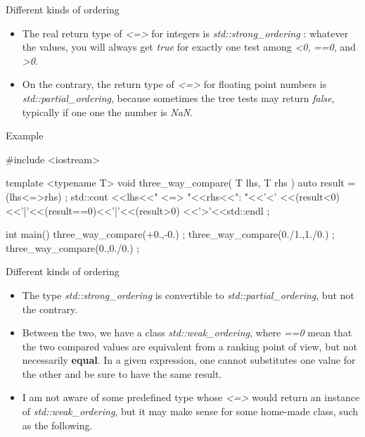 \begin{frame}[fragile]
  \begin{block}{Different kinds of ordering}
    \begin{itemize}
    \item The real return type of {\it <=>} for integers is {\it std::strong_ordering} : whatever the values, you will always get {\it true} for exactly one test among {\it <0}, {\it ==0}, and {\it >0}.
    \item On the contrary, the return type of {\it <=>} for floating point numbers is {\it std::partial_ordering}, because sometimes the tree tests may return {\it false}, typically if one one the number is {\it NaN}.
    \end{itemize}
  \end{block}
  \begin{exampleblock}{Example}
    \begin{cppcode*}{}
#include <iostream>

template <typename T>
void three_way_compare( T lhs, T rhs )
 {
  auto result = (lhs<=>rhs) ;
  std::cout
    <<lhs<<" <=> "<<rhs<<": "<<'<'
    <<(result<0)<<'|'<<(result==0)<<'|'<<(result>0)
    <<'>'<<std::endl ;
 }

int main()
 {
  three_way_compare(+0.,-0.) ;
  three_way_compare(0./1.,1./0.) ;
  three_way_compare(0.,0./0.) ;
 }
    \end{cppcode*}
  \end{exampleblock}
\end{frame}

\begin{frame}[fragile]
  \begin{block}{Different kinds of ordering}
    \begin{itemize}
      \item The type {\it std::strong_ordering} is convertible to {\it std::partial_ordering}, but not the contrary.
      \item Between the two, we have a class {\it std::weak_ordering}, where {\it ==0} mean that the two compared values are equivalent from a ranking point of view, but not necessarily \textbf{equal}. In a given expression, one cannot substitutes one value for the other and be sure to have the same result.
      \item I am not aware of some predefined type whose {\it <=>} would return an instance of {\it std::weak_ordering}, but it may make sense for some home-made class, such as the following.
    \end{itemize}
  \end{block}
\end{frame}

